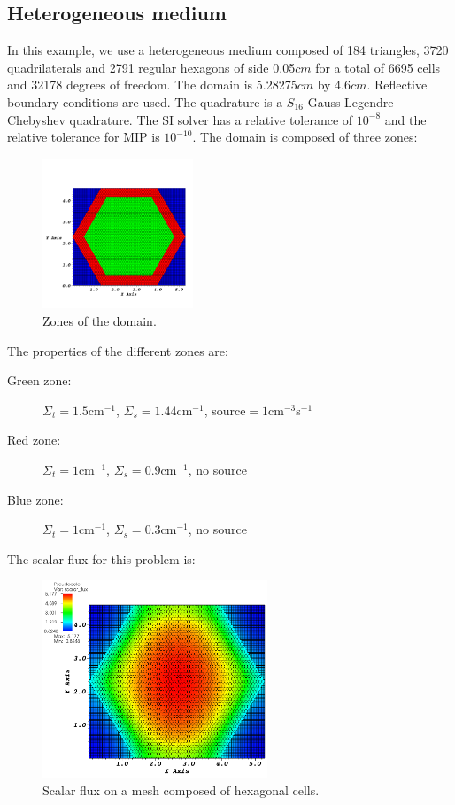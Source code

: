\subsection{Heterogeneous medium}
In this example, we use a heterogeneous medium composed of 184 triangles, 3720
quadrilaterals and 2791 regular hexagons of side 0.05$cm$ for a total of 6695 
cells and 32178 degrees of freedom. The domain is 5.28275$cm$ by 4.6$cm$. 
Reflective boundary conditions are used. The quadrature is a $S_{16}$ 
Gauss-Legendre-Chebyshev quadrature. The SI solver has a relative tolerance of 
$10^{-8}$ and the relative tolerance for MIP is $10^{-10}$. The domain is 
composed of three zones:
\begin{figure}[H]
\centering
\includegraphics[width=0.4\textwidth]{./Dsa/source_crop}
\caption{Zones of the domain.}
\end{figure}
The properties of the different zones are:
\begin{description}
\item[Green zone:] $\Sigma_t =1.5$cm$^{-1}$, $\Sigma_s = 1.44$cm$^{-1}$, source$ =
1$cm$^{-3}$s$^{-1}$
\item[Red zone:] $\Sigma_t = 1$cm$^{-1}$, $\Sigma_s = 0.9$cm$^{-1}$, no source
\item[Blue zone:] $\Sigma_t = 1$cm$^{-1}$, $\Sigma_s = 0.3$cm$^{-1}$, no source
\end{description}
The scalar flux for this problem is:
\begin{figure}[H]
\centering
\includegraphics[width=0.6\textwidth]{./Dsa/heterog_hex_crop_2}
\caption{Scalar flux on a mesh composed of hexagonal cells.}
\end{figure}

